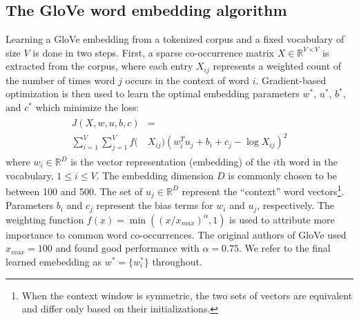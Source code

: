 \documentclass{article}
\newcommand{\Real}{\mathbb{R}}
\begin{document}
\subsection{The GloVe word embedding algorithm} 
Learning a GloVe \cite{GloVe} embedding from a tokenized corpus and a fixed vocabulary of size $V$ is done in two steps. 
First, a sparse co-occurrence matrix $X \in \Real ^{V \times V}$ is extracted from the corpus, where each entry $X_{ij}$ represents a weighted count of the number of times word $j$ occurs in the context of word $i$.
Gradient-based optimization is then used to learn the optimal embedding parameters $w^*$, $u^*$, $b^*$, and $c^*$ which minimize the loss:
\begin{align}\label{eq:glove}
\begin{split}
J(X, w, u, b, c) &= \\
\sum_{i=1}^V \sum_{j=1}^V f(&X_{ij}) (w_i ^T u_j + b_i + c_j - \log X_{ij})^2
\end{split}
\end{align}
where $w_i \in \Real^D$ is the vector representation (embedding) of the $i$th word in the vocabulary, $1 \leq i \leq V$. 
The embedding dimension $D$ is commonly chosen to be between 100 and 500. 
The set of $u_j \in \Real^{D}$ represent the ``context'' word vectors\footnote{When the context window is symmetric, the two sets of vectors are equivalent and differ only based on their initializations.}.
Parameters $b_i$ and $c_j$ represent the bias terms for $w_i$ and $u_j$, respectively.
The weighting function $f(x) = \min((x/x_{max})^\alpha, 1)$ is used to attribute more importance to common word co-occurrences.
The original authors of GloVe used $x_{max} = 100$ and found good performance with $\alpha = 0.75$.
We refer to the final learned emebedding as $w^* =\{w^*_i\}$ throughout.


\end{document}
